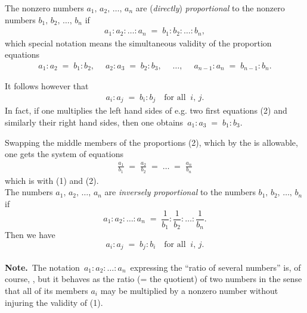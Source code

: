 \documentclass[12pt]{article}
\theoremstyle{definition}
\begin{document}

The nonzero numbers $a_1,\,a_2,\,\ldots,\,a_n$ are (\emph{directly}) \emph{proportional} to the nonzero numbers 
$b_1,\,b_2,\,\ldots,\,b_n$ if
\begin{align}
a_1\!:\!a_2\!:\ldots:\!a_n \;=\; b_1\!:\!b_2\!:\ldots:\!b_n,
\end{align}
which special notation means the simultaneous validity of the proportion equations
\begin{align}
a_1\!:\!a_2 \;=\; b_1\!:\!b_2, 
\;\quad a_2\!:\!a_3 \;=\; b_2\!:\!b_3,\;\quad \ldots, \;\quad 
a_{n-1}\!:\!a_n \;=\; b_{n-1}\!:\!b_n.
\end{align}

It follows however that 
\begin{align}
a_i\!:\!a_j \;=\; b_i\!:\!b_j \quad \mbox{for all}\;\; i,\,j.
\end{align}
In fact, if one multiplies the left hand sides of e.g. two first equations (2) and similarly their right hand sides, then one obtains\, $a_1\!:\!a_3 \;=\; b_1\!:\!b_3$.

Swapping the middle members of the proportions (2), which by the  is allowable, one gets the system of equations 
\begin{align}
\frac{a_1}{b_1} \;=\; \frac{a_2}{b_2} \;=\; \ldots \;=\; \frac{a_n}{b_n}
\end{align}
which is  with (1) and (2).\\

The numbers $a_1,\,a_2,\,\ldots,\,a_n$ are \emph{inversely proportional} to the numbers $b_1,\,b_2,\,\ldots,\,b_n$ if
$$a_1\!:\!a_2\!:\ldots:\!a_n \;=\; \frac{1}{b_1}\!:\!\frac{1}{b_2}\!:\ldots:\!\frac{1}{b_n}.$$
Then we have
$$a_i\!:\!a_j \;=\; b_j\!:\!b_i \quad \mbox{for all}\;\; i,\,j.$$\\


\textbf{Note.}\, The notation \,$a_1\!:\!a_2\!:\ldots:\!a_n$\, expressing the ``ratio of several numbers'' is, of course, , but it behaves as the ratio (= the quotient) of two numbers in the sense that all of its members $a_i$ may be multiplied by a nonzero number without injuring the validity of (1).\\
\end{document}
